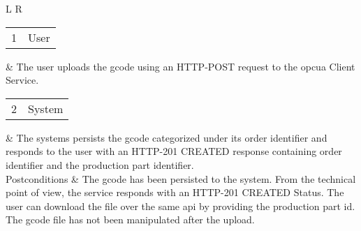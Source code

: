 \documentclass[
a4paper,
twoside,
headsepline,
cleardoublepage=empty,
parskip=half,
draft=false
]{scrbook}
\begin{document}
\begin{table}[hbtp]
\begin{tabular}{L R}
						\begin{tabular}{c c} 1 & User \end{tabular} & The user uploads the \gls{gcode} using an HTTP-POST request to the \gls{opcua} Client Service.
						\\ \midrule
						\begin{tabular}{c c} 2 & System \end{tabular} & The systems persists the \gls{gcode} categorized under its order identifier and responds to the user with an HTTP-201 CREATED response containing order identifier and the production part identifier.
						\\ \midrule
						Postconditions & The \gls{gcode} has been persisted to the system. From the technical point of view, the service responds with an HTTP-201 CREATED Status. The user can download the file over the same \gls{api} by providing the production part id. The \gls{gcode} file has not been manipulated after the upload.
						\\ \bottomrule
					\end{tabular}
				\end{table}
\end{document}
